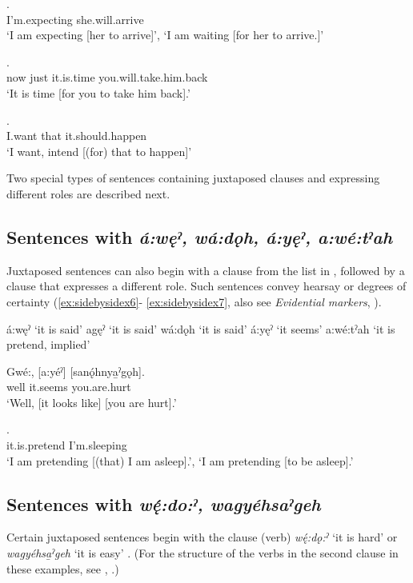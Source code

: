 \ea\label{ex:sidebysidex4} 
.\\
 I’m.expecting she.will.arrive\\
\glt ‘I am expecting [her to arrive]’, ‘I am waiting [for her to arrive.]’
\z

\ea\label{ex:sidebysidex400}  
.\\
 now just it.is.time you.will.take.him.back\\
\glt ‘It is time [for you to take him back].’
\z

\ea\label{ex:sidebysidex401} 
\gll [I:wí:] [to na:yá:węh].\\
 I.want that it.should.happen\\
\glt ‘I want, intend [(for) that to happen]’
\z

Two special types of sentences containing juxtaposed clauses and expressing different roles are described next.

\subsection{Sentences with \textit{á:węˀ, wá:dǫh, á:yęˀ, a:wé:tˀah}} \label{Sentences with á:węˀ, wá:dǫh, á:yęˀ, a:wé:tˀah}
Juxtaposed sentences can also begin with a clause from the list in , followed by a clause that expresses a different role. Such sentences convey hearsay or degrees of certainty (\ref{ex:sidebysidex6}- \ref{ex:sidebysidex7}, also see \textit{Evidential markers}, ).

\ea\label{ex:sidebysidex5} 
\ea á:węˀ ‘it is said’
\ex agęˀ ‘it is said’
\ex wá:dǫh ‘it is said’
\ex á:yęˀ ‘it seems’
\ex a:wé:tˀah ‘it is pretend, implied’
\z
\z

\ea\label{ex:sidebysidex6} 
\gll Gwé:, [a:yéˀ] [sanǫ́hnya̱ˀgǫh]. \\
well it.seems you.are.hurt\\
\glt ‘Well, [it looks like] [you are hurt].’ 
\z

\ea\label{ex:sidebysidex7} 
.\\
it.is.pretend I’m.sleeping\\
\glt ‘I am pretending [(that) I am asleep].’, ‘I am pretending [to be asleep].’
\z


\subsection{Sentences with \textit{wę́:do:ˀ, wagyéhsaˀgeh}} \label{Sentences with wę́:do:ˀ, wagyéhsaˀge}
Certain juxtaposed sentences begin with the clause (verb) \textit{wę́:dǫ:ˀ} ‘it is hard’  or \textit{wagyéhsa̱ˀgeh} ‘it is easy’ . (For the structure of the verbs in the second clause in these examples, see , .)

